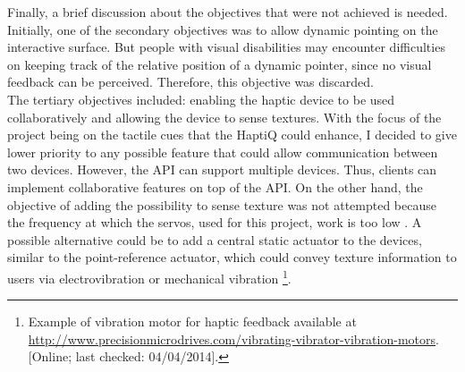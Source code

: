 Finally, a brief discussion about the objectives that were not achieved is needed. \\
Initially, one of the secondary objectives was to allow dynamic pointing on the interactive surface. But people with visual disabilities may encounter difficulties on keeping track of the relative position of a dynamic pointer, since no visual feedback can be perceived. Therefore, this objective was discarded. \\
The tertiary objectives included: enabling the haptic device to be used collaboratively and allowing the device to sense textures. 
With the focus of the project being on the tactile cues that the HaptiQ could enhance, I decided to give lower priority to any possible feature that could allow communication between two devices. However, the API can support multiple devices. Thus, clients can implement  collaborative features on top of the API.
On the other hand, the objective of adding the possibility to sense texture was not attempted because the frequency at which the servos, used for this project, work is too low \cite{brown2005first}. A possible alternative could be to add a central static actuator to the devices, similar to the point-reference actuator, which could convey texture information to users via electrovibration \cite{bau2012revel, bau2010teslatouch} or mechanical vibration \footnote{Example of vibration motor for haptic feedback available at \url{http://www.precisionmicrodrives.com/vibrating-vibrator-vibration-motors}. [Online; last checked: 04/04/2014].}.   